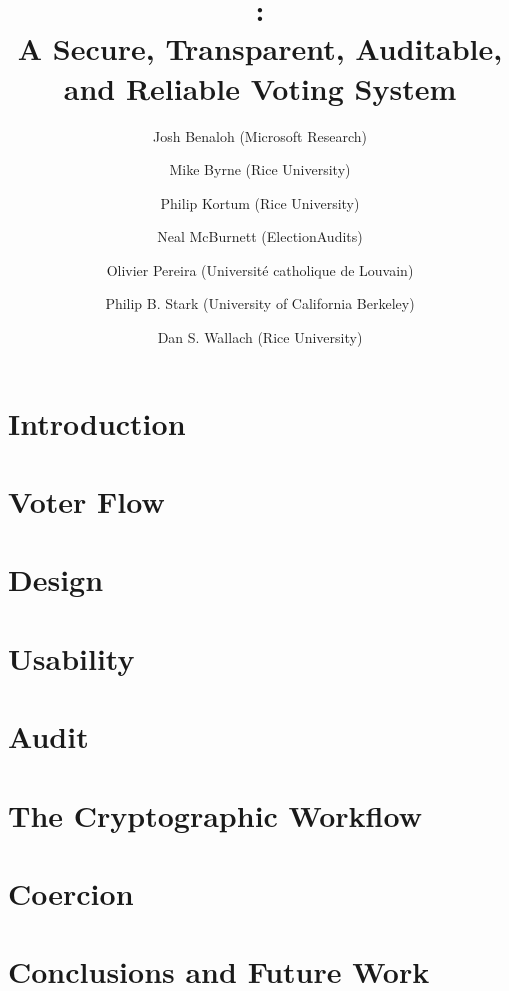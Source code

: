 \documentclass[letterpaper, 10pt, twocolumn]{article}
\title{\projname: \\
A Secure, Transparent, Auditable, and Reliable Voting
System}
\author{
Josh Benaloh (Microsoft Research) \and
Mike Byrne (Rice University) \and
Philip Kortum (Rice University) \and
Neal McBurnett (ElectionAudits) \and
Olivier Pereira (Université catholique de Louvain) \and
Philip B. Stark (University of California Berkeley) \and
Dan S. Wallach (Rice University)}
\begin{document}
\maketitle

\begin{abstract}

\end{abstract}

\section{Introduction}


\section{Voter Flow}


\section{Design}


\section{Usability}


\section{Audit}


\section{The Cryptographic Workflow}


\section{Coercion}


\section{Conclusions and Future Work}




\end{document}
